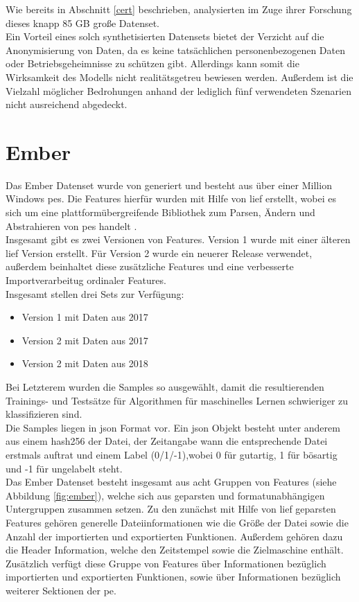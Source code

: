 \documentclass[
    12pt, %
    DIV10,
    ngerman, %
    a4paper, %
    oneside, %
    titlepage, %
    parskip=half, %
    headings=normal, %
    listof=totoc, %
    bibliography=totoc, %
    index=totoc, %
    captions=tableheading, %
    final %
]{scrreprt}
\begin{document}
Wie bereits in Abschnitt \ref{cert} beschrieben, analysierten \textcite{Le2019} im Zuge ihrer Forschung dieses knapp 85 GB gro{\ss}e Datenset.\\
Ein Vorteil eines solch synthetisierten Datensets bietet der Verzicht auf die Anonymisierung von Daten, da es keine tatsächlichen personenbezogenen Daten oder Betriebsgeheimnisse zu schützen gibt. Allerdings kann somit die Wirksamkeit des Modells nicht realitätsgetreu bewiesen werden. Au{\ss}erdem ist die Vielzahl möglicher Bedrohungen anhand der lediglich fünf verwendeten Szenarien nicht ausreichend abgedeckt.
\section{Ember}\label{sec:ember}
Das Ember Datenset wurde von \textcite{anderson2018ember} generiert und besteht aus über einer Million Windows \ac{pes}. Die Features hierfür wurden mit Hilfe von \ac{lief} erstellt, wobei es sich um eine plattformübergreifende Bibliothek zum Parsen, Ändern und Abstrahieren von \ac{pes} handelt \parencite{Quarkslab}.\\
Insgesamt gibt es zwei Versionen von Features. Version 1 wurde mit einer älteren \ac{lief} Version erstellt. Für Version 2 wurde ein neuerer Release verwendet, au{\ss}erdem beinhaltet diese zusätzliche Features und eine verbesserte Importverarbeitug ordinaler Features.\\
Insgesamt stellen \citeauthor{anderson2018ember} drei Sets zur Verfügung:
\begin{itemize}
\item Version 1 mit Daten aus 2017
\item Version 2 mit Daten aus 2017
\item Version 2 mit Daten aus 2018
\end{itemize}
Bei Letzterem wurden die Samples so ausgewählt, damit die resultierenden Trainings- und Testsätze für Algorithmen für maschinelles Lernen schwieriger zu klassifizieren sind.\\
Die Samples liegen in \ac{json} Format vor. Ein \ac{json} Objekt besteht unter anderem aus einem hash256 der Datei, der Zeitangabe wann die entsprechende Datei erstmals auftrat und einem Label (0/1/-1),wobei 0 für gutartig, 1 für bösartig und -1 für ungelabelt steht.\\
Das Ember Datenset besteht insgesamt aus acht Gruppen von Features (siehe Abbildung \ref{fig:ember}), welche sich aus geparsten und formatunabhängigen Untergruppen zusammen setzen. Zu den zunächst mit Hilfe von \ac{lief} geparsten Features gehören generelle Dateiinformationen wie die Grö{\ss}e der Datei sowie die Anzahl der importierten und exportierten Funktionen. Au{\ss}erdem gehören dazu die Header Information, welche den Zeitstempel sowie die Zielmaschine enthält. Zusätzlich verfügt diese Gruppe von Features über Informationen bezüglich importierten und exportierten Funktionen, sowie über Informationen bezüglich weiterer Sektionen der \ac{pe}.
\end{document}
